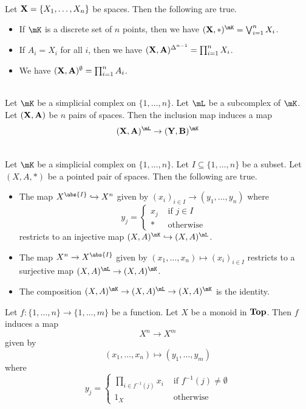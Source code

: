 \documentclass[a4paper]{article}
\begin{document}
\begin{eg}{}{}\\
Let $\bold{X}=\{X_1,\dots,X_n\}$ be spaces. Then the following are true. 
\begin{itemize}
\item If $\mK$ is a discrete set of $n$ points, then we have $(\bold{X},\ast)^\mK=\bigvee_{i=1}^nX_i$. 
\item If $A_i=X_i$ for all $i$, then we have $(\bold{X},\bold{A})^{\Delta^{n-1}}=\prod_{i=1}^nX_i$. 
\item We have $(\bold{X},\bold{A})^\emptyset=\prod_{i=1}^nA_i$. 
\end{itemize}
\end{eg}

\begin{prp}{}{}\\
Let $\mK$ be a simplicial complex on $\{1,\dots,n\}$. Let $\mL$ be a subcomplex of $\mK$. Let $(\bold{X},\bold{A})$ be $n$ pairs of spaces. Then the inclusion map induces a map $$(\bold{X},\bold{A})^\mL\to(\bold{Y},\bold{B})^\mK$$
\end{prp}

\begin{prp}{}{}\\
Let $\mK$ be a simplicial complex on $\{1,\dots,n\}$. Let $I\subseteq\{1,\dots,n\}$ be a subset. Let $(X,A,\ast)$ be a pointed pair of spaces. Then the following are true. 
\begin{itemize}
\item The map $X^\abs{I}\hookrightarrow X^n$ given by $(x_i)_{i\in I}\to(y_1,\dots,y_n)$ where $$y_j=\begin{cases}
x_j & \text{ if }j\in I\\
\ast & \text{ otherwise }
\end{cases}$$ restricts to an injective map $(X,A)^\mK\hookrightarrow(X,A)^\mL$. 
\item The map $X^n\to X^\abs{I}$ given by $(x_1,\dots,x_n)\mapsto(x_i)_{i\in I}$ restricts to a surjective map $(X,A)^\mL\to(X,A)^\mK$. 
\item The composition $(X,A)^\mK\to(X,A)^\mL\to(X,A)^\mK$ is the identity. 
\end{itemize}
\end{prp}

Let $f:\{1,\dots,n\}\to\{1,\dots,m\}$ be a function. Let $X$ be a monoid in $\bold{Top}$. Then $f$ induces a map $$X^n\to X^m$$ given by $$(x_1,\dots,x_n)\mapsto(y_1,\dots,y_m)$$ where $$y_j=\begin{cases}
\prod_{i\in f^{-1}(j)}x_i & \text{ if }f^{-1}(j)\neq\emptyset\\
1_X & \text{ otherwise }
\end{cases}$$
\end{document}

